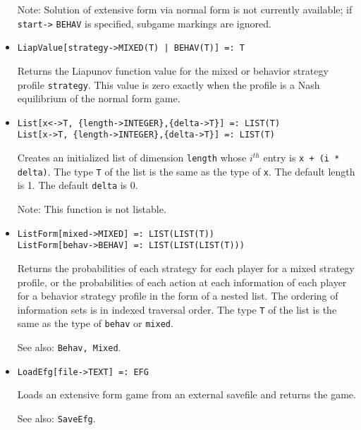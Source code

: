 \begin{itemize}
\item
[Note:] Solution of extensive form via normal form is not currently
available; if \verb+start->+ \verb+BEHAV+ is specified, subgame markings are ignored.
\ed

\item
\protect \large \begin{verbatim}
LiapValue[strategy->MIXED(T) | BEHAV(T)] =: T
\end{verbatim} \normalsize

\bd Returns the Liapunov function value for the mixed or behavior
strategy profile \verb+strategy+.  This value is zero exactly when the
profile is a Nash equilibrium of the normal form game.  
\ed

\item
\protect \large \begin{verbatim}
List[x<->T, {length->INTEGER},{delta->T}] =: LIST(T)
List[x->T, {length->INTEGER},{delta->T}] =: LIST(T)
\end{verbatim}\normalsize

\bd Creates an initialized list of dimension \verb+length+ whose
$i^{th}$ entry is \verb&x + (i * delta)&.  The type \verb+T+ of the list is
the same as the type of \verb+x+.  The default length is 1. The
default \verb+delta+ is 0.   
\item
[Note:] This function is not listable.
\ed

\item
\protect \large \begin{verbatim}
ListForm[mixed->MIXED] =: LIST(LIST(T))
ListForm[behav->BEHAV] =: LIST(LIST(LIST(T)))
\end{verbatim}\normalsize

\bd Returns the probabilities of each strategy for each player for a
mixed strategy profile, or the probabilities of each action at each
information of each player for a behavior strategy profile in the form
of a nested list.  The ordering of information sets is in indexed
traversal order.  The type \verb+T+ of the list is the same as the
type of \verb+behav+ or \verb+mixed+.
\item
[See also:] {\tt Behav, Mixed}.
\ed

\item
\protect \large \begin{verbatim}
LoadEfg[file->TEXT] =: EFG
\end{verbatim}\normalsize

\bd
Loads an extensive form game from an external savefile
and returns the game.
\item
[See also:] {\tt SaveEfg}.
\ed


\end{itemize}
